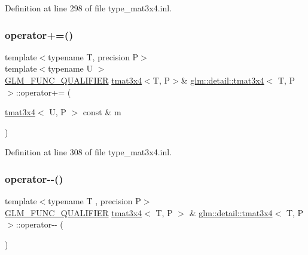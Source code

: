 Definition at line 298 of file type\+\_\+mat3x4.\+inl.

\mbox{\label{structglm_1_1detail_1_1tmat3x4_a9c28e24ea115b67e1901be600e1acac3}} 
\subsubsection{\texorpdfstring{operator+=()}{operator+=()}\hspace{0.1cm}{\footnotesize\ttfamily [4/4]}}
{\footnotesize\ttfamily template$<$typename T, precision P$>$ \\
template$<$typename U $>$ \\
\hyperlink{setup_8hpp_a33fdea6f91c5f834105f7415e2a64407}{G\+L\+M\+\_\+\+F\+U\+N\+C\+\_\+\+Q\+U\+A\+L\+I\+F\+I\+ER} \hyperlink{structglm_1_1detail_1_1tmat3x4}{tmat3x4}$<$T, P$>$\& \hyperlink{structglm_1_1detail_1_1tmat3x4}{glm\+::detail\+::tmat3x4}$<$ T, P $>$\+::operator+= (\begin{DoxyParamCaption}\item[{\hyperlink{structglm_1_1detail_1_1tmat3x4}{tmat3x4}$<$ U, P $>$ const \&}]{m }\end{DoxyParamCaption})}



Definition at line 308 of file type\+\_\+mat3x4.\+inl.

\mbox{\label{structglm_1_1detail_1_1tmat3x4_a0537b06d951dd3e6ea5da5c6cd1dc1e5}} 
\subsubsection{\texorpdfstring{operator-\/-\/()}{operator--()}\hspace{0.1cm}{\footnotesize\ttfamily [1/2]}}
{\footnotesize\ttfamily template$<$typename T , precision P$>$ \\
\hyperlink{setup_8hpp_a33fdea6f91c5f834105f7415e2a64407}{G\+L\+M\+\_\+\+F\+U\+N\+C\+\_\+\+Q\+U\+A\+L\+I\+F\+I\+ER} \hyperlink{structglm_1_1detail_1_1tmat3x4}{tmat3x4}$<$ T, P $>$ \& \hyperlink{structglm_1_1detail_1_1tmat3x4}{glm\+::detail\+::tmat3x4}$<$ T, P $>$\+::operator-\/-\/ (\begin{DoxyParamCaption}{ }\end{DoxyParamCaption})}



